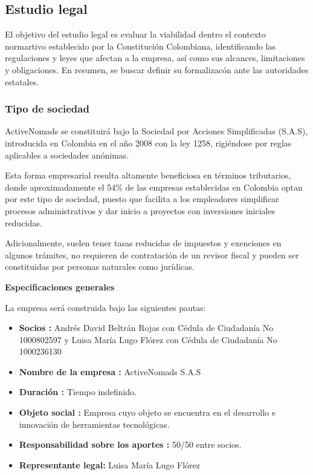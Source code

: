 \subsection{Estudio legal}
{\color{red}
El objetivo del estudio legal es evaluar la viabilidad dentro el contexto normartivo establecido por la Constitución Colombiana, identificando las regulaciones y leyes que afectan a la empresa, así como sus alcances,  limitaciones y obligaciones. En resumen, se buscar definir su formalizacón ante las autoridades estatales. 

\subsubsection*{Tipo de sociedad}

ActiveNomads se constituirá  bajo la Sociedad por Acciones Simplificadas (S.A.S), introducida en Colombia en el año 2008 con la ley 1258, rigiéndose por reglas aplicables a sociedades anónimas. 

Esta forma empresarial resulta altamente beneficiosa en términos tributarios, donde aproximadamente el 54\% de las empresas establecidas en Colombia optan por este tipo de sociedad, puesto que facilita a los empleadores simplificar procesos administrativos y dar inicio a proyectos con inversiones iniciales reducidas. 

Adicionalmente, suelen tener tasas reducidas de impuestos y exenciones en algunos trámites, no requieren de contratación de un revisor fiscal y pueden ser constituidas por personas naturales como jurídicas. 

\textbf{Especificaciones generales}
\newline

La empresa será construida bajo las siguientes pautas:

\begin{itemize}
    \item \textbf{Socios : } Andrés David Beltrán Rojas con Cédula de Ciudadanía No 1000802597 y Luisa María Lugo Flórez con Cédula de Ciudadanía No 1000236130
    \item \textbf{Nombre de la empresa :} ActiveNomads S.A.S
    \item \textbf{Duración :} Tiempo indefinido.
    \item \textbf{Objeto social :} Empresa cuyo objeto se encuentra en el desarrollo e innovación de herramientas tecnológicas.
    \item \textbf{Responsabilidad sobre los aportes :} 50/50 entre socios.
    \item \textbf{Representante legal: } Luisa María Lugo Flórez
\end{itemize}

}

